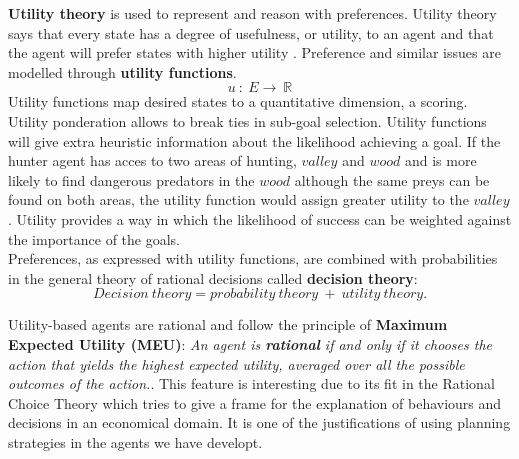 \documentclass[11pt,oneside,a4paper,openright]{report}
\begin{document}
\begin{description}
\begin{description}
		\textbf{Utility theory} is used to represent and reason with preferences. Utility theory says that
		every state has a degree of usefulness, or utility, to an agent and that the agent will prefer 
		states with higher utility \cite{RussellNorvig}. Preference and similar issues are modelled through
		\textbf{utility functions}. 
			\begin{equation}
			 u\ :\ E \rightarrow \ \mathbb{R}
			\end{equation}
		Utility functions map desired states to a quantitative dimension, a scoring. Utility ponderation 
		allows to break ties in sub-goal selection. Utility functions will give extra heuristic information
		about the likelihood achieving a goal. If the hunter agent has acces to two areas of hunting, $valley$
		and $wood$ and is more likely to find dangerous predators in the $wood$ although the same preys can 
		be found on both areas, the utility function would assign greater utility to the $valley$. Utility
 		provides a way in which the likelihood of success can be weighted against the importance of the goals.\\
		Preferences, as expressed with utility functions, are combined with probabilities in the general 
		theory of rational decisions called \textbf{decision theory}: \cite{RussellNorvig}
			\begin{equation}
			Decision\ theory = probability\ theory\ +\ utility\ theory .
			\end{equation}

		Utility-based agents are rational and follow the principle of \textbf{Maximum Expected Utility (MEU)}: 
		\textit{An agent is \textbf{rational} if and only if it chooses the action that yields the highest
		expected utility, averaged over all the possible outcomes of the action.}\cite{RussellNorvig}.
		This feature is interesting due to its fit in the Rational Choice Theory \cite{rationalchoicetheo} which tries to give a frame for the explanation of behaviours and decisions in an economical domain.
		It is one of the justifications of using planning strategies in the agents we have developt.

	\end{description}


		
\end{description}
\end{document}
